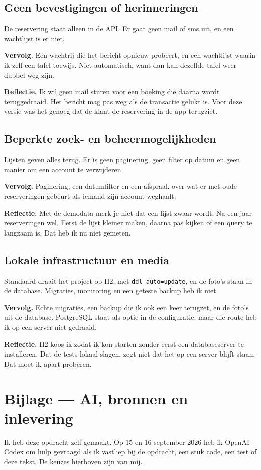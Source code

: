 \documentclass[11pt]{article}
\begin{document}
\subsection{Geen bevestigingen of herinneringen}
De reservering staat alleen in de API. Er gaat geen mail of sms uit, en een
wachtlijst is er niet.

\textbf{Vervolg.} Een wachtrij die het bericht opnieuw probeert, en een
wachtlijst waarin ik zelf een tafel toewijs. Niet automatisch, want dan kan
dezelfde tafel weer dubbel weg zijn.

\textbf{Reflectie.} Ik wil geen mail sturen voor een boeking die daarna wordt
teruggedraaid. Het bericht mag pas weg als de transactie gelukt is. Voor deze
versie was het genoeg dat de klant de reservering in de app terugziet.

\subsection{Beperkte zoek- en beheermogelijkheden}
Lijsten geven alles terug. Er is geen paginering, geen filter op datum en geen
manier om een account te verwijderen.

\textbf{Vervolg.} Paginering, een datumfilter en een afspraak over wat er met
oude reserveringen gebeurt als iemand zijn account weghaalt.

\textbf{Reflectie.} Met de demodata merk je niet dat een lijst zwaar wordt. Na
een jaar reserveringen wel. Eerst de lijst kleiner maken, daarna pas kijken of
een query te langzaam is. Dat heb ik nu niet gemeten.

\subsection{Lokale infrastructuur en media}
Standaard draait het project op H2, met \texttt{ddl-auto=update}, en de foto's
staan in de database. Migraties, monitoring en een geteste backup heb ik niet.

\textbf{Vervolg.} Echte migraties, een backup die ik ook een keer terugzet, en
de foto's uit de database. PostgreSQL staat als optie in de configuratie, maar
die route heb ik op een server niet gedraaid.

\textbf{Reflectie.} H2 koos ik zodat ik kon starten zonder eerst een
databaseserver te installeren. Dat de tests lokaal slagen, zegt niet dat het op
een server blijft staan. Dat moet ik apart proberen.

\section{Bijlage --- AI, bronnen en inlevering}
Ik heb deze opdracht zelf gemaakt. Op 15 en 16 september 2026 heb ik
OpenAI Codex om hulp gevraagd als ik vastliep bij de opdracht, een stuk code,
een test of deze tekst. De keuzes hierboven zijn van mij.
\end{document}
